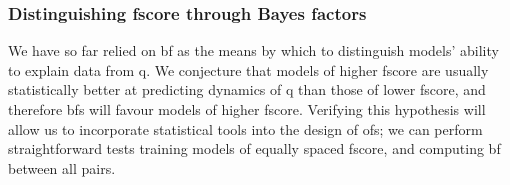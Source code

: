 \subsubsection{Distinguishing \gls{fscore} through Bayes factors}\label{sec:bf_by_f_score}
We have so far relied on \gls{bf} as the means by which to distinguish models' 
    ability to explain data from \gls{q}. 
We conjecture that models of higher \gls{fscore} are usually statistically better at predicting dynamics of \gls{q}
    than those of lower \gls{fscore}, and therefore \glspl{bf} will favour models of higher \gls{fscore}.
Verifying this hypothesis will allow us to incorporate statistical tools into the design of \glspl{of};
    we can perform straightforward tests training models of equally spaced \gls{fscore}, and computing \acrshort{bf} between all pairs.
\par 

